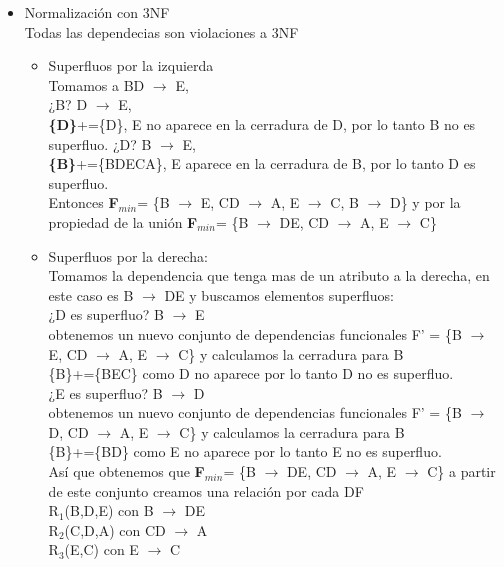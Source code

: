 \documentclass{article}
\begin{document}
\begin{enumerate}
\begin{itemize}
\begin{itemize}
    			\item Normalización con 3NF\\
    			Todas las dependecias son violaciones a 3NF\\
    			\begin{itemize}
    				\item Superfluos por la izquierda\\
    				Tomamos a BD $\rightarrow$ E,\\
    				¿B? D $\rightarrow$ E,\\
    				\textbf{\{D\}}+=\{D\}, E no aparece en la cerradura de D, por lo tanto B no es superfluo.
    				¿D? B $\rightarrow$ E,\\
    				\textbf{\{B\}}+=\{BDECA\}, E aparece en la cerradura de B, por lo tanto D es superfluo.\\
    				
    				Entonces \textbf{F$_{min}$}= \{B $\rightarrow$ E, CD $\rightarrow$ A, E $\rightarrow$ C, B $\rightarrow$ D\} y por la propiedad de la unión \textbf{F$_{min}$}= \{B $\rightarrow$ DE, CD $\rightarrow$ A, E $\rightarrow$ C\} \\
    				
    				
    				\item Superfluos por la derecha:\\
    				Tomamos la dependencia que tenga mas de un atributo a la derecha, en este caso es B $\rightarrow$ DE y buscamos elementos superfluos:\\
    				¿D es superfluo? B $\rightarrow$ E \\
    				obtenemos un nuevo conjunto de dependencias funcionales F' = \{B $\rightarrow$ E, CD $\rightarrow$ A, E $\rightarrow$ C\} y calculamos la cerradura para B\\
    				\{B\}+=\{BEC\} como D no aparece por lo tanto D no es superfluo.\\
    				
    				¿E es superfluo? B $\rightarrow$ D \\
    				obtenemos un nuevo conjunto de dependencias funcionales F' = \{B $\rightarrow$ D, CD $\rightarrow$ A, E $\rightarrow$ C\} y calculamos la cerradura para B\\
    				\{B\}+=\{BD\} como E no aparece por lo tanto E no es superfluo.\\
    				
    				Así que obtenemos que \textbf{F$_{min}$}= \{B $\rightarrow$ DE, CD $\rightarrow$ A, E $\rightarrow$ C\} a partir de este conjunto creamos una relación por cada DF\\
    				R$_1$(B,D,E) con B $\rightarrow$ DE\\
    				R$_2$(C,D,A) con  CD $\rightarrow$ A\\
    				R$_3$(E,C) con E $\rightarrow$ C\\
    				

\end{itemize}
\end{itemize}
\end{itemize}
\end{enumerate}
\end{document}
